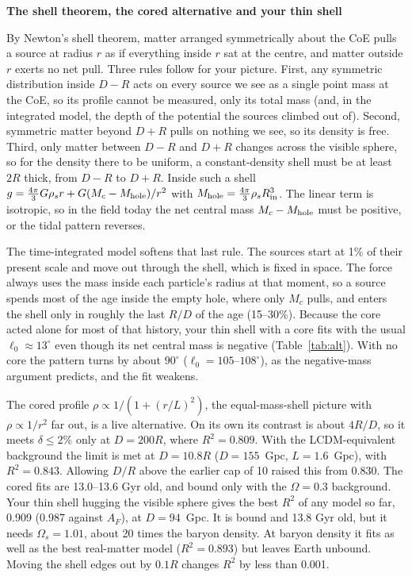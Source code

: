 \clearpage
\begin{center}{\large\bfseries The shell theorem, the cored alternative and your thin shell}\end{center}
\vspace{-4pt}
By Newton's shell theorem, matter arranged symmetrically about the CoE pulls a source at radius $r$ as if everything inside $r$ sat at the centre, and matter outside $r$ exerts no net pull. Three rules follow for your picture. First, any symmetric distribution inside $D-R$ acts on every source we see as a single point mass at the CoE, so its profile cannot be measured, only its total mass (and, in the integrated model, the depth of the potential the sources climbed out of). Second, symmetric matter beyond $D+R$ pulls on nothing we see, so its density is free. Third, only matter between $D-R$ and $D+R$ changes across the visible sphere, so for the density there to be uniform, a constant-density shell must be at least $2R$ thick, from $D-R$ to $D+R$. Inside such a shell $g=\tfrac{4\pi}{3}G\rho_s r+G(M_c-M_{\rm hole})/r^2$ with $M_{\rm hole}=\tfrac{4\pi}{3}\rho_sR_{\rm in}^3$. The linear term is isotropic, so in the field today the net central mass $M_c-M_{\rm hole}$ must be positive, or the tidal pattern reverses.

The time-integrated model softens that last rule. The sources start at 1\% of their present scale and move out through the shell, which is fixed in space. The force always uses the mass inside each particle's radius at that moment, so a source spends most of the age inside the empty hole, where only $M_c$ pulls, and enters the shell only in roughly the last $R/D$ of the age (15--30\%). Because the core acted alone for most of that history, your thin shell with a core fits with the usual $\ell_0\approx13^\circ$ even though its net central mass is negative (Table~\ref{tab:alt}). With no core the pattern turns by about $90^\circ$ ($\ell_0=105$--$108^\circ$), as the negative-mass argument predicts, and the fit weakens.

The cored profile $\rho\propto1/(1+(r/L)^2)$, the equal-mass-shell picture with $\rho\propto1/r^2$ far out, is a live alternative. On its own its contrast is about $4R/D$, so it meets $\delta\le2\%$ only at $D=200R$, where $R^2=0.809$. With the LCDM-equivalent background the limit is met at $D=10.8R$ ($D=155$~Gpc, $L=1.6$~Gpc), with $R^2=0.843$. Allowing $D/R$ above the earlier cap of 10 raised this from 0.830. The cored fits are 13.0--13.6 Gyr old, and bound only with the $\Omega=0.3$ background. Your thin shell hugging the visible sphere gives the best $R^2$ of any model so far, 0.909 (0.987 against $A_F$), at $D=94$~Gpc. It is bound and 13.8 Gyr old, but it needs $\Omega_s=1.01$, about 20 times the baryon density. At baryon density it fits as well as the best real-matter model ($R^2=0.893$) but leaves Earth unbound. Moving the shell edges out by $0.1R$ changes $R^2$ by less than 0.001.

